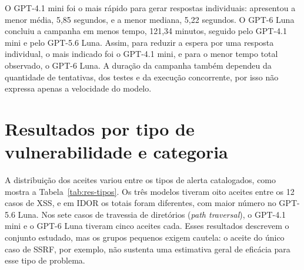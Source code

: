 O GPT-4.1 mini foi o mais rápido para gerar respostas individuais: apresentou a menor média, 5,85 segundos, e a menor mediana, 5,22 segundos. O GPT-6 Luna concluiu a campanha em menos tempo, 121,34 minutos, seguido pelo GPT-4.1 mini e pelo GPT-5.6 Luna. Assim, para reduzir a espera por uma resposta individual, o mais indicado foi o GPT-4.1 mini, e para o menor tempo total observado, o GPT-6 Luna. A duração da campanha também dependeu da quantidade de tentativas, dos testes e da execução concorrente, por isso não expressa apenas a velocidade do modelo.

\section{Resultados por tipo de vulnerabilidade e categoria}
\label{sec:res-tipos}

A distribuição dos aceites variou entre os tipos de alerta catalogados, como mostra a Tabela~\ref{tab:res-tipos}. Os três modelos tiveram oito aceites entre os 12 casos de XSS, e em IDOR os totais foram diferentes, com maior número no GPT-5.6 Luna. Nos sete casos de travessia de diretórios (\textit{path traversal}), o GPT-4.1 mini e o GPT-6 Luna tiveram cinco aceites cada. Esses resultados descrevem o conjunto estudado, mas os grupos pequenos exigem cautela: o aceite do único caso de SSRF, por exemplo, não sustenta uma estimativa geral de eficácia para esse tipo de problema.

